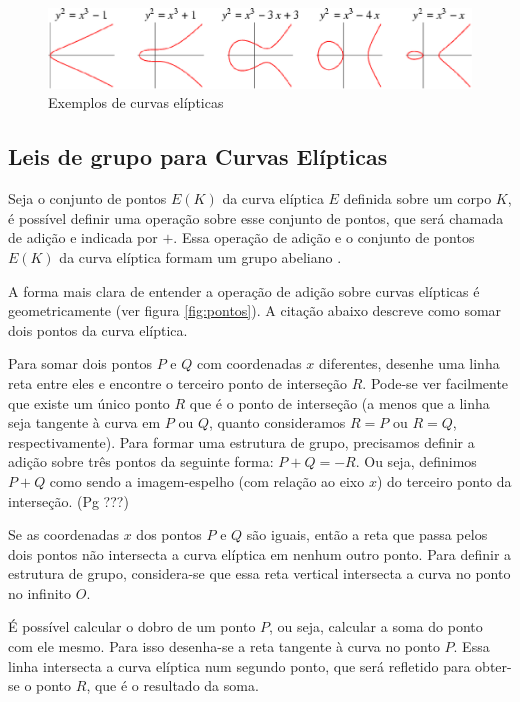 \begin{figure}[h]
\centering
\includegraphics[scale=0.5, bb=0 0 529 101]{figuras/curvas.eps}
\caption{Exemplos de curvas elípticas}
\label{fig:curvas}
\end{figure}

\subsection{Leis de grupo para Curvas Elípticas}

Seja o conjunto de pontos $E(K)$ da curva elíptica $E$ definida sobre um corpo $K$, é possível definir uma operação sobre esse conjunto de pontos, que será chamada de adição e indicada por $+$. Essa operação de adição e o conjunto de pontos $E(K)$ da curva elíptica formam um grupo abeliano \cite{Stallings:2011}.

A forma mais clara de entender a operação de adição sobre curvas elípticas é geometricamente (ver figura \ref{fig:pontos}). A citação abaixo descreve como somar dois pontos da curva elíptica.
\begin{citacao}
Para somar dois pontos \(P\) e \(Q\) com coordenadas \(x\) diferentes, desenhe uma linha reta entre eles e encontre o terceiro ponto de interseção \(R\). Pode-se ver facilmente que existe um único ponto \(R\) que é o ponto de interseção (a menos que a linha seja tangente à curva em \(P\) ou \(Q\), quanto consideramos $R=P$ ou $R=Q$, respectivamente). Para formar uma estrutura de grupo, precisamos definir a adição sobre três pontos da seguinte forma: $P+Q=-R$. Ou seja, definimos $P+Q$ como sendo a imagem-espelho (com relação ao eixo \(x\)) do terceiro ponto da interseção. \cite{Stallings:2011} (Pg ???)
\end{citacao}

Se as coordenadas $x$ dos pontos $P$ e $Q$ são iguais, então a reta que passa pelos dois pontos não intersecta a curva elíptica em nenhum outro ponto. Para definir a estrutura de grupo, considera-se que essa reta vertical intersecta a curva no ponto no infinito $O$. \cite{Stallings:2011}

É possível calcular o dobro de um ponto $P$, ou seja, calcular a soma do ponto com ele mesmo. Para isso desenha-se a reta tangente à curva no ponto $P$. Essa linha intersecta a curva elíptica num segundo ponto, que será refletido para obter-se o ponto $R$, que é o resultado da soma. \cite{Hankerson:2004}

